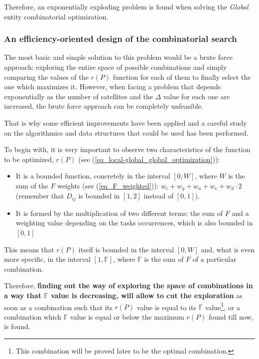 Therefore, an exponentially exploding problem is found when solving the \emph{Global} entity combinatorial optimization.

\subsubsection{An efficiency-oriented design of the combinatorial search}

The most basic and simple solution to this problem would be a brute force approach: exploring the entire space of possible combinations and simply comparing the values of the $r(P)$ function for each of them to finally select the one which maximizes it. However, when facing a problem that depends exponentially as the number of satellites and the $\Delta$ value for each one are increased, the brute force approach can be completely unfeasible.

That is why some efficient improvements have been applied and a careful study on the algorithmics and data structures that could be used has been performed.

To begin with, it is very important to observe two characteristics of the function to be optimized, $r(P)$ (see (\ref{eq_local-global_global_optimization})):
\begin{itemize}
\item It is a bounded function, concretely in the interval $\left[0, W\right]$, where $W$ is the sum of the $F$ weights (see (\ref{eq_F_weighted})): $w_c + w_g + w_u + w_e + w_d\cdot 2$ (remember that $D_{ij}$ is bounded in $\left[1, 2\right]$ instead of $\left[0, 1\right]$).
\item It is formed by the multiplication of two different terms: the sum of $F$ and a weighting value depending on the tasks occurrences, which is also bounded in $\left[0, 1\right]$
\end{itemize}

This means that $r(P)$ itself is bounded in the interval $\left[0, W\right]$ and, what is even more specific, in the interval $\left[1, \mathbb{F}\right]$, where $\mathbb{F}$ is the sum of $F$ of a particular combination.

Therefore, \textbf{finding out the way of exploring the space of combinations in a way that $\mathbb{F}$ value is decreasing, will allow to cut the exploration} as soon as a combination such that its $r(P)$ value is equal to its $\mathbb{F}$ value\footnote{This combination will be proved later to be the optimal combination.}, or a combination which $\mathbb{F}$ value is equal or below the maximum $r(P)$ found till now, is found.

